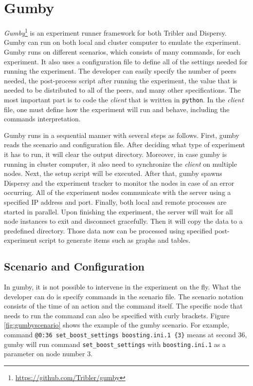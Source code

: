 \section{Gumby}
\label{section:gumby}
\textit{Gumby}\footnote{\url{https://github.com/Tribler/gumby}} is an experiment runner framework for both Tribler and Dispersy. Gumby can run on both local and cluster computer to emulate the experiment. Gumby runs on different scenarios, which consists of many commands, for each experiment. It also uses a configuration file to define all of the settings needed for running the experiment. The developer can easily specify the number of peers needed, the post-process script after running the experiment, the value that is needed to be distributed to all of the peers, and many other specifications. The most important part is to code the \textit{client} that is written in \texttt{python}. In the \textit{client} file, one must define how the experiment will run and behave, including the commands interpretation.

Gumby runs in a sequential manner with several steps as follows. First, gumby reads the scenario and configuration file. After deciding what type of experiment it has to run, it will clear the output directory. Moreover, in case gumby is running in cluster computer, it also need to synchronize the \textit{client} on multiple nodes. Next, the setup script will be executed. After that, gumby spawns Dispersy and the experiment tracker to monitor the nodes in case of an error occurring. All of the experiment nodes communicate with the server using a specified IP address and port. Finally, both local and remote processes are started in parallel. Upon finishing the experiment, the server will wait for all node instances to exit and disconnect gracefully. Then it will copy the data to a predefined directory. Those data now can be processed using specified post-experiment script to generate items such as graphs and tables.

\subsection{Scenario and Configuration}
In gumby, it is not possible to intervene in the experiment on the fly. What the developer can do is specify commands in the scenario file. The scenario notation consists of the time of an action and the command itself. The specific node that needs to run the command can also be specified with curly brackets. Figure \ref{fig:gumbyscenario} shows the example of the gumby scenario. For example, command \texttt{@0:36 set\_boost\_settings boosting.ini.1 \{3\}} means at second 36, gumby will run command \texttt{set\_boost\_settings} with \texttt{boosting.ini.1} as a parameter on node number 3. 

